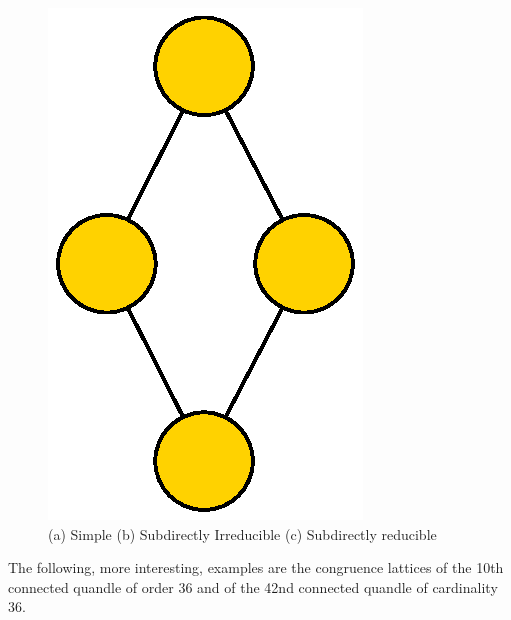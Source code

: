 \begin{figure}[H]
\includegraphics[scale=0.6]{Thesis/images/Coloured28_2LatticeGraph.eps}\hfill

\caption{(a) Simple (b) Subdirectly Irreducible (c) Subdirectly reducible}
\label{fig:conglattice}

\end{figure}
\noindent The following, more interesting, examples are the congruence lattices of the 10th connected quandle of order 36 and of the 42nd connected quandle of cardinality 36.
